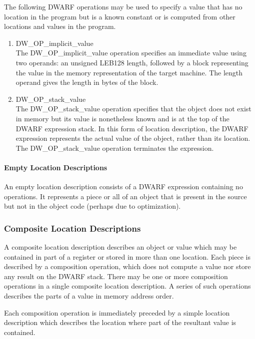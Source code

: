 The following DWARF operations may be used to specify a value
that has no location in the program but is a known constant
or is computed from other locations and values in the program.

\begin{enumerate}[1]
\item DW\_OP\_implicit\_value \\
The DW\_OP\_implicit\_value operation specifies an immediate value
using two operands: an unsigned LEB128 length, followed by
a block representing the value in the memory representation
of the target machine. The length operand gives the length
in bytes of the block.

\item DW\_OP\_stack\_value \\
The DW\_OP\_stack\_value operation specifies that the object
does not exist in memory but its value is nonetheless known
and is at the top of the DWARF expression stack. In this form
of location description, the DWARF expression represents the
actual value of the object, rather than its location. The
DW\_OP\_stack\_value operation terminates the expression.
\end{enumerate}


\paragraph{Empty Location Descriptions}

An empty location description consists of a DWARF expression
containing no operations. It represents a piece or all of an
object that is present in the source but not in the object code
(perhaps due to optimization).

\subsubsection{Composite Location Descriptions}
A composite location description describes an object or
value which may be contained in part of a register or stored
in more than one location. Each piece is described by a
composition operation, which does not compute a value nor
store any result on the DWARF stack. There may be one or
more composition operations in a single composite location
description. A series of such operations describes the parts
of a value in memory address order.

Each composition operation is immediately preceded by a simple
location description which describes the location where part
of the resultant value is contained.

